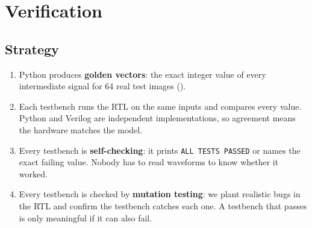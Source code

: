 \documentclass[11pt]{article}
\begin{document}
\section{Verification}\label{sec:verif}

\subsection{Strategy}
\begin{enumerate}
  \item Python produces \textbf{golden vectors}: the exact integer value of every
        intermediate signal for 64 real test images ().
  \item Each testbench runs the RTL on the same inputs and compares every value.
        Python and Verilog are independent implementations, so agreement means
        the hardware matches the model.
  \item Every testbench is \textbf{self-checking}: it prints
        \texttt{ALL TESTS PASSED} or names the exact failing value. Nobody has to
        read waveforms to know whether it worked.
  \item Every testbench is checked by \textbf{mutation testing}: we plant
        realistic bugs in the RTL and confirm the testbench catches each one.
        A testbench that passes is only meaningful if it can also fail.
\end{enumerate}
\end{document}
